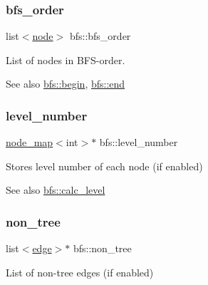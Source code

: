 \subsubsection{\texorpdfstring{bfs\+\_\+order}{bfs\_order}}
{\footnotesize\ttfamily list$<$\mbox{\hyperlink{classnode}{node}}$>$ bfs\+::bfs\+\_\+order\hspace{0.3cm}{\ttfamily [protected]}}



List of nodes in B\+F\+S-\/order. 

\begin{DoxySeeAlso}{See also}
\mbox{\hyperlink{classbfs_a350eb3e4fcfea5c9c9cd18f54a722289}{bfs\+::begin}}, \mbox{\hyperlink{classbfs_a355a37450bce8f14548983d5c6097aea}{bfs\+::end}} 
\end{DoxySeeAlso}
\mbox{\label{classbfs_aab92e9d128612c28324aafe4750dbc84}} 
\subsubsection{\texorpdfstring{level\+\_\+number}{level\_number}}
{\footnotesize\ttfamily \mbox{\hyperlink{classnode__map}{node\+\_\+map}}$<$int$>$$\ast$ bfs\+::level\+\_\+number\hspace{0.3cm}{\ttfamily [protected]}}



Stores level number of each node (if enabled) 

\begin{DoxySeeAlso}{See also}
\mbox{\hyperlink{classbfs_aa02df0b00c5fbaa29b9a41a211732e0f}{bfs\+::calc\+\_\+level}} 
\end{DoxySeeAlso}
\mbox{\label{classbfs_aa6783e3e2ac4235403b37df3ee3ee968}} 
\subsubsection{\texorpdfstring{non\+\_\+tree}{non\_tree}}
{\footnotesize\ttfamily list$<$\mbox{\hyperlink{classedge}{edge}}$>$$\ast$ bfs\+::non\+\_\+tree\hspace{0.3cm}{\ttfamily [protected]}}



List of non-\/tree edges (if enabled) 


